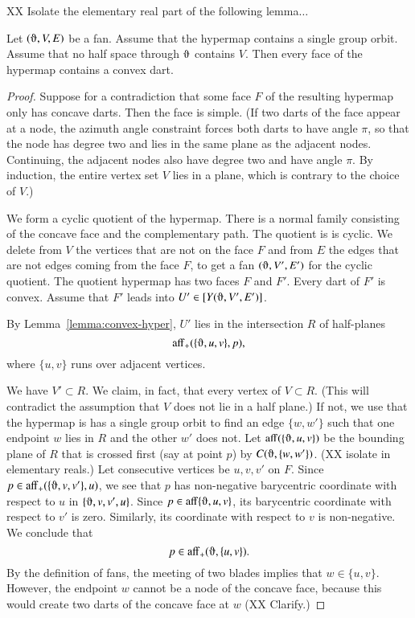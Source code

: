 \begin{lemma} 
XX Isolate the elementary real part of the following lemma$\ldots$
\end{lemma}

\begin{lemma}\label{lemma:cx-dart}  
Let $(\orgn,V,E)$ be a fan. Assume that the hypermap contains a single
group orbit.   
Assume that no half space
through $\orgn$ contains $V$.  Then every face of the hypermap contains
a convex dart.
\end{lemma}

\begin{proof}
Suppose for a contradiction that 
some face $F$ of the resulting hypermap only has concave darts.  Then
the face is simple.  (If two darts
of the face appear at a node, the azimuth angle constraint forces both darts to
have angle $\pi$, so that the node has degree two and lies in the same plane
as the adjacent nodes.  Continuing, the adjacent nodes also have degree two and
have angle $\pi$.  By induction, the entire vertex set $V$ lies in a plane, which
is contrary to the choice of $V$.)      

We form a cyclic quotient of the hypermap.
There
is a normal family consisting of the concave face and the complementary path.
The quotient is is cyclic.  We delete from $V$ the vertices that are not on the face $F$ and from $E$ the edges that are not edges coming from the face $F$,
to get a fan $(\orgn,V',E')$ for the cyclic quotient.
The quotient hypermap has two faces $F$ and $F'$.  Every dart
of $F'$ is convex.  Assume that $F'$ leads into $U'\in[Y(\orgn,V',E')]$.

By Lemma~\ref{lemma:convex-hyper}, $U'$
lies in the intersection $R$ of half-planes
$$
\op{aff}_+(\{\orgn,u,v\},p),
$$
where $\{u,v\}$ runs over adjacent vertices.  

We have $V'\subset R$.  We claim, in fact, that
every vertex of $V\subset R$.
(This will contradict the assumption that $V$ does not lie in a half plane.)
If not, we use that the hypermap is has a single group orbit 
to find an edge $\{w,w'\}$ such
that one endpoint $w$ lies in $R$ and the other $w'$ does not.  
Let $\op{aff}(\{\orgn,u,v\})$ be the bounding plane of $R$ that 
is crossed first (say at point $p$) by
$C(\orgn,\{w,w'\})$.  (XX isolate in elementary reals.)  
Let consecutive vertices be $u,v,v'$ on $F$.  Since
$p\in \op{aff}_+(\{\orgn,v,v'\},u)$, 
we see that $p$ has non-negative barycentric
coordinate with respect to $u$ in $\{\orgn,v,v',u\}$.  Since $p\in \op{aff}\{\orgn,u,v\}$,
its barycentric coordinate with respect to $v'$ is zero.  Similarly, its
coordinate with respect to $v$ is non-negative.  We conclude that 
  $$p\in \op{aff}_+(\orgn,\{u,v\}).$$
By the definition of fans, the meeting of two
blades implies that $w\in\{u,v\}$.
However, the endpoint $w$ cannot be a node of the concave face, because this would
create two darts of the concave face at $w$ (XX Clarify.)
\end{proof}

